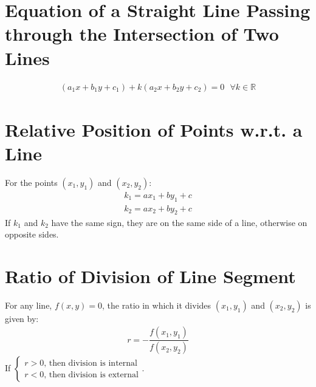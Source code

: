 \documentclass[../main.tex]{subfile}
\begin{document}
	\section{Equation of a Straight Line Passing through the Intersection of Two Lines\newline}
	\begin{align}
		(a_1x+b_1y+c_1)+k(a_2x+b_2y+c_2)=0\text{ }\forall k\in\mathbb{R}
	\end{align}
	
	\section{Relative Position of Points w.r.t. a Line}
	For the points $(x_1,y_1)$ and $(x_2,y_2)$:
	\begin{align}
		k_1=ax_1+by_1+c\nonumber\\
		k_2=ax_2+by_2+c\nonumber
	\end{align}
	If $k_1$ and $k_2$ have the same sign, they are on the same side of a line, otherwise on opposite sides.
	
	\section{Ratio of Division of Line Segment}
	For any line, $f(x,y)=0$, the ratio in which it divides $(x_1,y_1)$ and $(x_2,y_2)$ is given by:
	\begin{align}
		r=-\dfrac{f(x_1,y_1)}{f(x_2,y_2)}
	\end{align}
	If $\begin{cases}r>0\text{, then division is internal}\\r<0\text{, then division is external}\end{cases}$.
\end{document}
